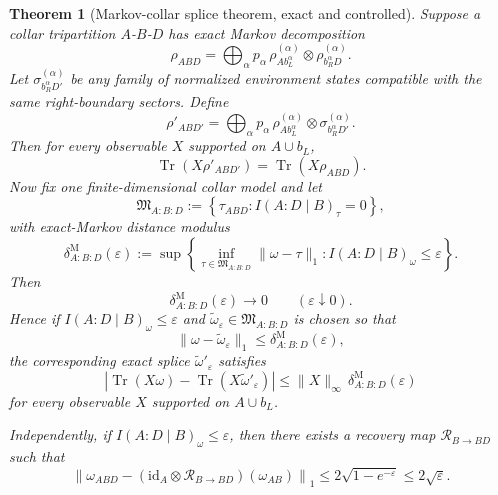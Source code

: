 \documentclass[11pt]{article}
\newtheorem{theorem}{Theorem}[section]
\theoremstyle{remark}
\theoremstyle{plain}
\begin{document}
\begin{theorem}[Markov-collar splice theorem, exact and controlled]\label{thm:splice}
Suppose a collar tripartition $A$-$B$-$D$ has exact Markov decomposition
\[
\rho_{ABD}
=
\bigoplus_{\alpha}
p_\alpha\,
\rho^{(\alpha)}_{A b_L^\alpha}
\otimes
\rho^{(\alpha)}_{b_R^\alpha D}.
\]
Let $\sigma_{b_R^\alpha D'}^{(\alpha)}$ be any family of normalized environment states compatible with the same right-boundary sectors. Define
\[
\rho'_{AB D'}
=
\bigoplus_{\alpha}
p_\alpha\,
\rho^{(\alpha)}_{A b_L^\alpha}
\otimes
\sigma_{b_R^\alpha D'}^{(\alpha)}.
\]
Then for every observable $X$ supported on $A\cup b_L$,
\[
\operatorname{Tr}(X\rho'_{AB D'})
=
\operatorname{Tr}(X\rho_{ABD}).
\]
Now fix one finite-dimensional collar model and let
\[
\mathfrak M_{A:B:D}
:=
\left\{
\tau_{ABD}: I(A:D\mid B)_\tau=0
\right\},
\]
with exact-Markov distance modulus
\[
\delta^{\mathrm M}_{A:B:D}(\varepsilon)
:=
\sup\left\{
\inf_{\tau\in\mathfrak M_{A:B:D}}\|\omega-\tau\|_1:
I(A:D\mid B)_\omega\le\varepsilon
\right\}.
\]
Then
\[
\delta^{\mathrm M}_{A:B:D}(\varepsilon)\to0
\qquad
(\varepsilon\downarrow0).
\]
Hence if \(I(A:D\mid B)_\omega\le \varepsilon\) and \(\widetilde\omega_\varepsilon\in\mathfrak M_{A:B:D}\) is chosen so that
\[
\|\omega-\widetilde\omega_\varepsilon\|_1
\le
\delta^{\mathrm M}_{A:B:D}(\varepsilon),
\]
the corresponding exact splice \(\widetilde\omega'_\varepsilon\) satisfies
\[
\left|
\operatorname{Tr}(X\omega)-\operatorname{Tr}(X\widetilde\omega'_\varepsilon)
\right|
\le
\|X\|_\infty\,
\delta^{\mathrm M}_{A:B:D}(\varepsilon)
\]
for every observable \(X\) supported on \(A\cup b_L\).

Independently, if \(I(A:D\mid B)_\omega\le \varepsilon\), then there exists a recovery map \(\mathcal R_{B\to BD}\) such that
\[
\left\|
\omega_{ABD}
-
(\mathrm{id}_A\otimes \mathcal R_{B\to BD})(\omega_{AB})
\right\|_1
\le
2\sqrt{1-e^{-\varepsilon}}
\le
2\sqrt{\varepsilon}.
\]
\end{theorem}
\end{document}
